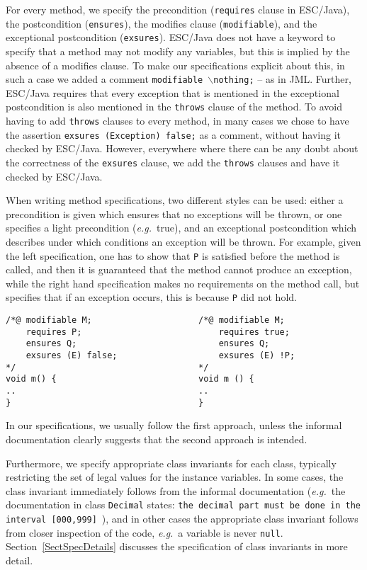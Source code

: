 \documentclass[a4paper]{llncs}
\newcommand{\noth}{\(\backslash\)\texttt{nothing}}
\begin{document}
For every method, we specify the precondition (\texttt{requires} clause
in ESC/Java), the postcondition (\texttt{ensures}), the modifies
clause (\texttt{modifiable}), and the exceptional postcondition
(\texttt{exsures}). ESC/Java does not have a keyword to specify that a
method may not modify any variables, but this is implied by the
absence of a modifies clause. To make our specifications explicit
about this, in such a case we added a comment
\texttt{modifiable \noth;} -- as in JML. Further, ESC/Java requires 
that every exception that is mentioned in the exceptional
postcondition is also mentioned in the \texttt{throws} clause of the
method. To avoid having to add \texttt{throws} clauses to every method,
in many cases we chose to have the assertion \texttt{exsures
(Exception) false;} as a comment, without having it checked by
ESC/Java. However, everywhere where there can be any doubt about the
correctness of the \texttt{exsures} clause, we add the \texttt{throws}
clauses and have it checked by ESC/Java.

When writing method specifications, two different styles can be used:
either a precondition is given which ensures that no exceptions
will be thrown, or one specifies a light precondition
(\emph{e.g.}~true), and an exceptional postcondition which describes
under which conditions an exception will be thrown. For example, given
the left specification, one has to show that \texttt{P} is satisfied
before the method is called, and then it is guaranteed that the method
cannot produce an exception, while the right hand specification makes
no requirements on the method call, but specifies that if an exception
occurs, this is because \texttt{P} did not hold.
\begin{verbatim}
/*@ modifiable M;                     /*@ modifiable M;
    requires P;                           requires true;
    ensures Q;                            ensures Q;
    exsures (E) false;                    exsures (E) !P;
*/                                    */
void m() {                            void m () {
..                                    ..
}                                     }
\end{verbatim}

In our specifications, we usually follow the first approach,
unless the informal documentation clearly suggests that the second
approach is intended.

Furthermore, we specify appropriate class invariants for each class,
typically restricting the set of legal values for the instance
variables. In some cases, the class invariant immediately follows from
the informal documentation (\emph{e.g.}~the documentation in class
\texttt{Decimal} states:
\texttt{the decimal part must be done in the interval 
[000,999]}~\cite{PurseUrl}), and in other cases the appropriate class
invariant follows from closer inspection of the code, \emph{e.g.}~a
variable is never \texttt{null}.  Section~\ref{SectSpecDetails}
discusses the specification of class invariants in more detail.
\end{document}

